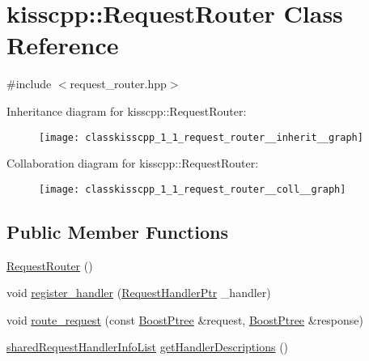 \hypertarget{classkisscpp_1_1_request_router}{\section{kisscpp\-:\-:Request\-Router Class Reference}
\label{classkisscpp_1_1_request_router}
}


{\ttfamily \#include $<$request\-\_\-router.\-hpp$>$}



Inheritance diagram for kisscpp\-:\-:Request\-Router\-:\nopagebreak
\begin{figure}[H]
\begin{center}
\leavevmode
\texttt{[image: classkisscpp\_1\_1\_request\_router\_\_inherit\_\_graph]}
\end{center}
\end{figure}


Collaboration diagram for kisscpp\-:\-:Request\-Router\-:\nopagebreak
\begin{figure}[H]
\begin{center}
\leavevmode
\texttt{[image: classkisscpp\_1\_1\_request\_router\_\_coll\_\_graph]}
\end{center}
\end{figure}
\subsection*{Public Member Functions}
\begin{DoxyCompactItemize}
\item 
\hyperlink{classkisscpp_1_1_request_router_a3f894769b8eaac5829a078528d94450e}{Request\-Router} ()
\item 
void \hyperlink{classkisscpp_1_1_request_router_ad99c50deee2ddca6bed2277886ecd3fa}{register\-\_\-handler} (\hyperlink{namespacekisscpp_a21e40edcd4f1a3c7c1cc0015b576c8e5}{Request\-Handler\-Ptr} \-\_\-handler)
\item 
void \hyperlink{classkisscpp_1_1_request_router_a5b53460864642f4b4ea435a3297102a6}{route\-\_\-request} (const \hyperlink{boost__ptree_8hpp_ab36820650b8e0db36402aea80485633c}{Boost\-Ptree} \&request, \hyperlink{boost__ptree_8hpp_ab36820650b8e0db36402aea80485633c}{Boost\-Ptree} \&response)
\item 
\hyperlink{namespacekisscpp_aa107348bd263ff2c9358b497155d37b8}{shared\-Request\-Handler\-Info\-List} \hyperlink{classkisscpp_1_1_request_router_a90d1738f2e97b5e8dbc13b8ce524747c}{get\-Handler\-Descriptions} ()
\end{DoxyCompactItemize}


